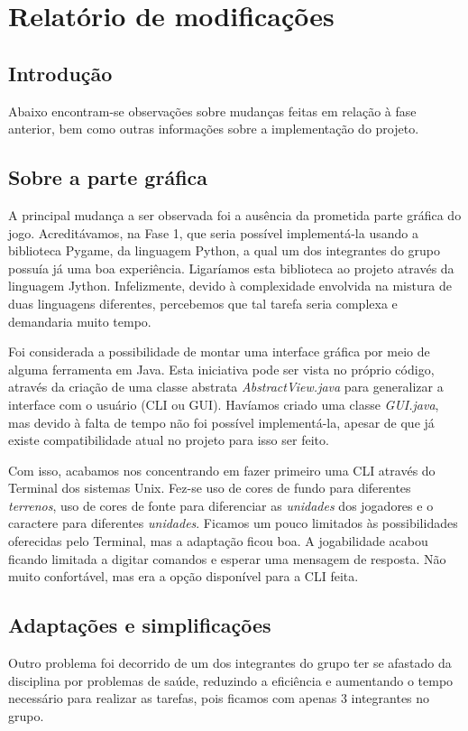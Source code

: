 \section{Relatório de modificações}

\subsection{Introdução}
    Abaixo encontram-se observações sobre mudanças feitas em relação à fase anterior, bem como outras informações sobre a implementação do projeto.

\subsection{Sobre a parte gráfica}
    A principal mudança a ser observada foi a ausência da prometida parte gráfica do jogo. Acreditávamos, na Fase 1, que seria possível implementá-la usando a biblioteca Pygame, da linguagem Python, a qual um dos integrantes do grupo possuía já uma boa experiência. Ligaríamos esta biblioteca ao projeto através da linguagem Jython. Infelizmente, devido à complexidade envolvida na mistura de duas linguagens diferentes, percebemos que tal tarefa seria complexa e demandaria muito tempo. \par

    Foi considerada a possibilidade de montar uma interface gráfica por meio de alguma ferramenta em Java. Esta iniciativa pode ser vista no próprio código, através da criação de uma classe abstrata \emph{AbstractView.java} para generalizar a interface com o usuário (CLI ou GUI). Havíamos criado uma classe \emph{GUI.java}, mas devido à falta de tempo não foi possível implementá-la, apesar de que já existe compatibilidade atual no projeto para isso ser feito. \par

    Com isso, acabamos nos concentrando em fazer primeiro uma CLI através do Terminal dos sistemas Unix. Fez-se uso de cores de fundo para diferentes \emph{terrenos}, uso de cores de fonte para diferenciar as \emph{unidades} dos jogadores e o caractere para diferentes \emph{unidades}. Ficamos um pouco limitados às possibilidades oferecidas pelo Terminal, mas a adaptação ficou boa. A jogabilidade acabou ficando limitada a digitar comandos e esperar uma mensagem de resposta. Não muito confortável, mas era a opção disponível para a CLI feita.

\subsection{Adaptações e simplificações}
    Outro problema foi decorrido de um dos integrantes do grupo ter se afastado da disciplina por problemas de saúde, reduzindo a eficiência e aumentando o tempo necessário para realizar as tarefas, pois ficamos com apenas 3 integrantes no grupo.\par

